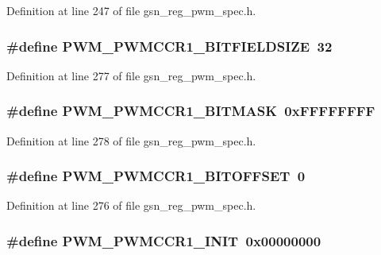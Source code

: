 Definition at line 247 of file gsn\_\-reg\_\-pwm\_\-spec.h.

\hypertarget{a00565_af940af59835c3aaade205c23e1f0305c}{
\subsubsection[{PWM\_\-PWMCCR1\_\-BITFIELDSIZE}]{\setlength{\rightskip}{0pt plus 5cm}\#define PWM\_\-PWMCCR1\_\-BITFIELDSIZE~32}}
\label{a00565_af940af59835c3aaade205c23e1f0305c}


Definition at line 277 of file gsn\_\-reg\_\-pwm\_\-spec.h.

\hypertarget{a00565_a007d09bc215a10dc77951153d07070df}{
\subsubsection[{PWM\_\-PWMCCR1\_\-BITMASK}]{\setlength{\rightskip}{0pt plus 5cm}\#define PWM\_\-PWMCCR1\_\-BITMASK~0xFFFFFFFF}}
\label{a00565_a007d09bc215a10dc77951153d07070df}


Definition at line 278 of file gsn\_\-reg\_\-pwm\_\-spec.h.

\hypertarget{a00565_abfe1fa91401442ffba6dad205931bf9c}{
\subsubsection[{PWM\_\-PWMCCR1\_\-BITOFFSET}]{\setlength{\rightskip}{0pt plus 5cm}\#define PWM\_\-PWMCCR1\_\-BITOFFSET~0}}
\label{a00565_abfe1fa91401442ffba6dad205931bf9c}


Definition at line 276 of file gsn\_\-reg\_\-pwm\_\-spec.h.

\hypertarget{a00565_acf04b09e34761a2e587b0e4f777f87bd}{
\subsubsection[{PWM\_\-PWMCCR1\_\-INIT}]{\setlength{\rightskip}{0pt plus 5cm}\#define PWM\_\-PWMCCR1\_\-INIT~0x00000000}}
\label{a00565_acf04b09e34761a2e587b0e4f777f87bd}


